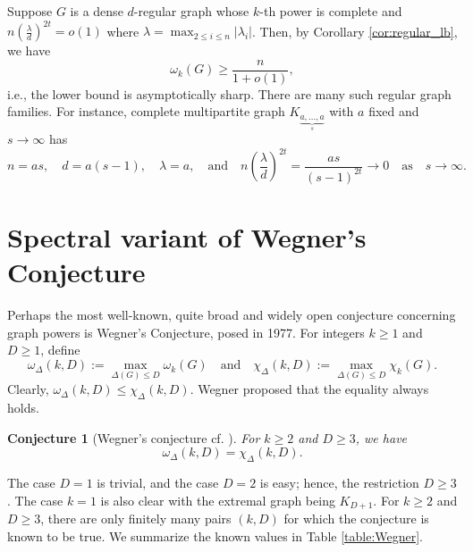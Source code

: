 \documentclass[11pt]{article}
\theoremstyle{plain}
\newtheorem{conjecture}[theorem]{Conjecture}
\numberwithin{equation}{section}
\begin{document}
Suppose $G$ is a dense $d$-regular graph whose $k$-th power is complete and $n\left(\frac{\lambda}{d}\right)^{2t} = o(1)$ where $\lambda = \max_{2\le i\le n} |\lambda_i|$. Then, by Corollary \ref{cor:regular_lb}, we have 
\[\omega_k(G)\ge \frac{n}{1 + o(1)}, \]
i.e., the lower bound is asymptotically sharp. There are many such regular graph families. For instance, complete multipartite graph $K_{\underbrace{a, \ldots, a}_{s}}$ with $a$ fixed and $s\to \infty$ has 
\[n = as, \quad d = a(s-1), \quad \lambda = a, \quad \text{and}\quad n\left(\frac{\lambda}{d}\right)^{2t} = \frac{as}{(s-1)^{2t}}\to 0\quad \text{as} \quad s\to \infty.\]  

\section{Spectral variant of Wegner's Conjecture}\label{sec:Wegner}


Perhaps the most well-known, quite broad and widely open conjecture concerning graph powers is Wegner's Conjecture, posed in 1977. For integers $k\ge 1$ and $D\ge 1$, define 
\[ \omega_\Delta(k,D):=\max_{\Delta(G)\le D}\omega_k(G) \quad \text{and}\quad \chi_\Delta(k,D) :=\max_{\Delta(G)\le D}\chi_k(G).\]
Clearly, $\omega_\Delta(k,D)\le \chi_\Delta(k,D)$. Wegner proposed that the equality always holds. 

\begin{conjecture}[Wegner's conjecture \cite{Wegner_1977} cf. \cite{Cranston_2023}]\label{conj:Wegner} For $k\ge 2$ and $D\ge 3$, we have 
\[  \omega_\Delta(k,D) =\chi_\Delta(k,D).\]
\end{conjecture}

The case $D=1$ is trivial, and the case $D=2$ is easy; hence, the restriction $D\ge 3$. The case $k=1$ is also clear with the extremal graph being $K_{D+1}$. For $k\ge 2$ and $D\ge 3$, there are only finitely many pairs $(k, D)$ for which the conjecture is known to be true. We summarize the known values in Table \ref{table:Wegner}. 
\end{document}
